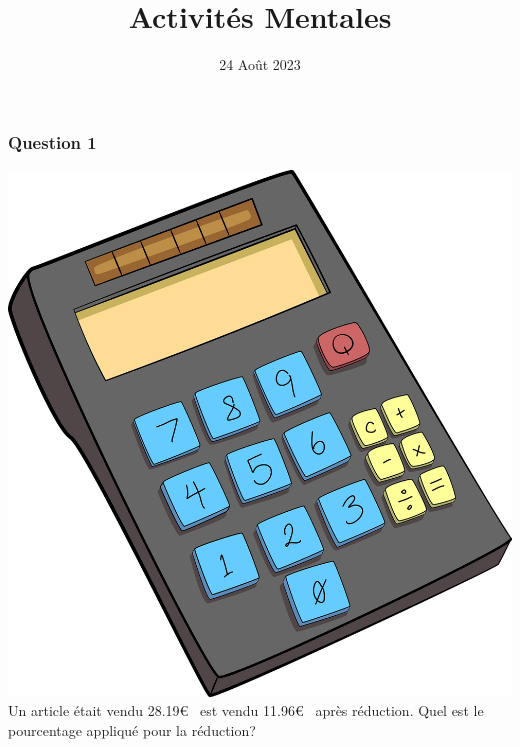 \documentclass[15pt, mathserif]{beamer}
\title{Activités Mentales}
\date{24 Août 2023}
\begin{document}
\begin{frame}
    \titlepage
\end{frame}

\begin{frame} 
	\frametitle{Question 1}
\includegraphics[scale=0.01]{calculatrice}Un article était vendu 28.19\euro ~ est vendu 11.96\euro ~ après réduction. Quel est le pourcentage appliqué pour la réduction? \end{frame}
\end{document}

